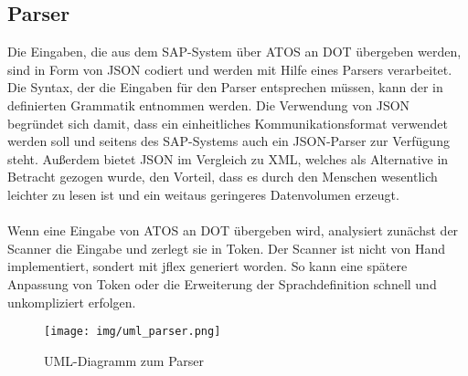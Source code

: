 \subsection{Parser}\label{chp:parser}
Die Eingaben, die aus dem SAP-System über \textsc{ATOS} an \textsc{DOT} übergeben werden, sind in Form von \textsf{JSON} codiert und werden mit Hilfe eines Parsers verarbeitet. Die Syntax, der die Eingaben für den Parser entsprechen müssen, kann der in  definierten Grammatik entnommen werden. Die Verwendung von \textsf{JSON} begründet sich damit, dass ein einheitliches Kommunikationsformat verwendet werden soll und seitens des SAP-Systems auch ein \textsf{JSON}-Parser zur Verfügung steht. Außerdem bietet \textsf{JSON} im Vergleich zu \textsf{XML}, welches als Alternative in Betracht gezogen wurde, den Vorteil, dass es durch den Menschen wesentlich leichter zu lesen ist und ein weitaus geringeres Datenvolumen erzeugt. \\
\\
Wenn eine Eingabe von \textsc{ATOS} an \textsc{DOT} übergeben wird, analysiert zunächst der \textsf{Scanner} die Eingabe und zerlegt sie in \textsf{Token}. Der Scanner ist nicht von Hand implementiert, sondert mit \textsf{jflex} generiert worden. So kann eine spätere Anpassung von Token oder die Erweiterung der Sprachdefinition schnell und unkompliziert erfolgen. \\

\begin{wrapfigure}{r}{0.6\textwidth}
  \vspace{-20pt}
  \begin{center}
    \texttt{[image: img/uml\_parser.png]}
  \end{center}
  \vspace{-20pt}
  \caption{UML-Diagramm zum Parser}
  \vspace{-10pt}
\end{wrapfigure}

